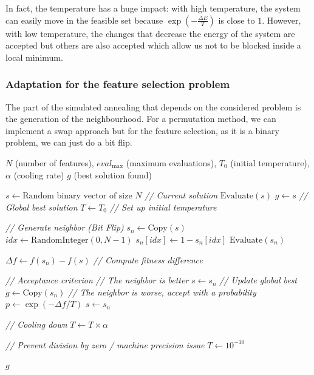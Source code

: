 \documentclass[12pt, openany]{article}
\begin{document}
In fact, the temperature has a huge impact: with high temperature, the system can easily move in the feasible set because $\exp\left(-\frac{\Delta E}{T}\right)$ is close to $1$. However, with low temperature, the changes that decrease the energy of the system are accepted but others are also accepted which allow us not to be blocked inside a local minimum.

\subsubsection{Adaptation for the feature selection problem}

The part of the simulated annealing that depends on the considered problem is the generation of the neighbourhood. For a permutation method, we can implement a swap approach but for the feature selection, as it is a binary problem, we can just do a bit flip.
\begin{algorithm}[H]
\caption{Simulated Annealing for Feature Selection}
\label{alg:sa_fs}
\begin{algorithmic}[1]
\Require $N$ (number of features), $eval_{\max}$ (maximum evaluations), $T_0$ (initial temperature), $\alpha$ (cooling rate)
\Ensure $g$ (best solution found)

\State $s \gets \text{Random binary vector of size } N$ \textit{// Current solution}
\State $\text{Evaluate}(s)$
\State $g \gets s$ \textit{// Global best solution}
\State $T \gets T_0$ \textit{// Set up initial temperature}

    \vspace{0.1cm}
    \State \textit{// Generate neighbor (Bit Flip)}
    \State $s_n \gets \text{Copy}(s)$
    \State $idx \gets \text{RandomInteger}(0, N - 1)$
    \State $s_n[idx] \gets 1 - s_n[idx]$
    \State $\text{Evaluate}(s_n)$
    
    \vspace{0.1cm}
    \State $\Delta f \gets f(s_n) - f(s)$ \textit{// Compute fitness difference}
    
    \vspace{0.1cm}
    \State \textit{// Acceptance criterion}
     \textit{// The neighbor is better}
        \State $s \gets s_n$
        \vspace{0.1cm}
        \State \textit{// Update global best}
            \State $g \gets \text{Copy}(s_n)$
        \EndIf
    \Else \textit{// The neighbor is worse, accept with a probability}
        \State $p \gets \exp(-\Delta f / T)$
            \State $s \gets s_n$
        \EndIf
    \EndIf
    
    \vspace{0.1cm}
    \State \textit{// Cooling down}
    \State $T \gets T \times \alpha$
    
    \vspace{0.1cm}
    \State \textit{// Prevent division by zero / machine precision issue}
        \State $T \gets 10^{-10}$
    \EndIf
\EndFor

\State \Return $g$
\end{algorithmic}
\end{algorithm}
\end{document}
